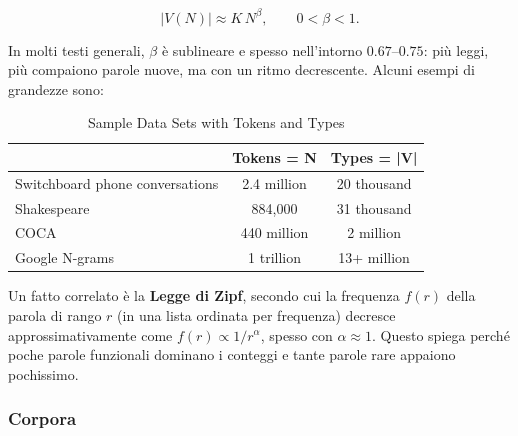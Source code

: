                 $$
                    |V(N)| \approx K\,N^{\beta}, \qquad 0<\beta<1.
                $$   
        
                In molti testi generali, $\beta$ è sublineare e spesso nell’intorno $0.67\text{–}0.75$: più leggi, più compaiono parole nuove, ma con un ritmo decrescente. Alcuni esempi di grandezze sono: 
    
                \begin{table}[h]
                    \centering
                    
                    \begin{tabular}{lcc}
                    
                        \toprule
                        
                        & Tokens = N & Types = |V| \\
                        
                        \midrule
                        
                        Switchboard phone conversations & 2.4 million & 20 thousand \\
                        Shakespeare & 884,000 & 31 thousand \\
                        COCA & 440 million & 2 million \\
                        Google N-grams & 1 trillion & 13+ million \\
                        
                        \bottomrule
                    
                    \end{tabular}
                    
                    \caption{Sample Data Sets with Tokens and Types}
                    \label{tab:sample_data}
                \end{table}
                
                Un fatto correlato è la \textbf{Legge di Zipf}, secondo cui la frequenza $f(r)$ della parola di rango $r$ (in una lista ordinata per frequenza) decresce approssimativamente come $f(r)\propto 1/r^{\alpha}$, spesso con $\alpha\approx 1$. Questo spiega perché poche parole funzionali dominano i conteggi e tante parole rare appaiono pochissimo.\\

            \subsubsection{Corpora}

